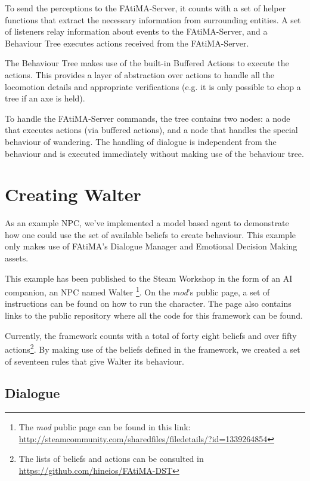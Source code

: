 To send the perceptions to the FAtiMA-Server, it counts with a set of helper functions that extract the necessary information from surrounding entities.
A set of listeners relay information about events to the FAtiMA-Server, and a Behaviour Tree executes actions received from the FAtiMA-Server.

The Behaviour Tree makes use of the built-in Buffered Actions to execute the actions.
This provides a layer of abstraction over actions to handle all the locomotion details and appropriate verifications (e.g. it is only possible to chop a tree if an axe is held).

To handle the FAtiMA-Server commands, the tree contains two nodes: a node that executes actions (via buffered actions), and a node that handles the special behaviour of wandering.
The handling of dialogue is independent from the behaviour and is executed immediately without making use of the behaviour tree.

\section{Creating Walter}

As an example NPC, we've implemented a model based agent to demonstrate how one could use the set of available beliefs to create behaviour.
This example only makes use of FAtiMA's Dialogue Manager and Emotional Decision Making assets.

This example has been published to the Steam Workshop in the form of an AI companion, an NPC named Walter \footnote{The \textit{mod} public page can be found in this link: \href{http://steamcommunity.com/sharedfiles/filedetails/?id=1339264854}{http://steamcommunity.com/sharedfiles/filedetails/?id=1339264854}}.
On the \textit{mod}'s public page, a set of instructions can be found on how to run the character.
The page also contains links to the public repository where all the code for this framework can be found.

Currently, the framework counts with a total of forty eight beliefs and over fifty actions\footnote{The lists of beliefs and actions can be consulted in \href{https://github.com/hineios/FAtiMA-DST}{https://github.com/hineios/FAtiMA-DST}}.
By making use of the beliefs defined in the framework, we created a set of seventeen rules that give Walter its behaviour.

\subsection{Dialogue}

